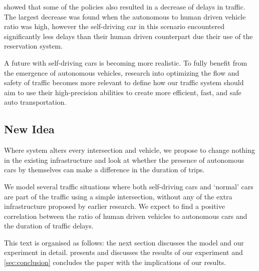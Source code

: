 \textcite{dresner2007sharing} showed that some of the policies also resulted in a decrease of delays in traffic. The largest decrease was found when the autonomous to human driven vehicle ratio was high, however the self-driving car in this scenario encountered significantly less delays than their human driven counterpart due their use of the reservation system.

A future with self-driving cars is becoming more realistic. To fully benefit from the emergence of autonomous vehicles, research into optimizing the flow and safety of traffic becomes more relevant to define how our traffic system should aim to use their high-precision abilities to create more efficient, fast, and safe auto transportation.


\subsection{New Idea}
\label{sub:intro:new_idea}	
Where \textcite{dresner2007sharing} system alters every intersection and vehicle, we propose to change nothing in the existing infrastructure and look at whether the presence of autonomous cars by themselves can make a difference in the duration of trips. 

We model several traffic situations where both self-driving cars and `normal' cars are part of the traffic using a simple intersection, without any of the extra infrastructure proposed by earlier research. We expect to find a positive correlation between the ratio of human driven vehicles to autonomous cars and the duration of traffic delays.

This text is organised as follows: the next section discusses the model and our experiment in detail.  presents and discusses the results of our experiment and \cref{sec:conclusion} concludes the paper with the implications of our results.